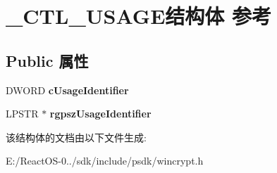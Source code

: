 \hypertarget{struct___c_t_l___u_s_a_g_e}{}\section{\+\_\+\+C\+T\+L\+\_\+\+U\+S\+A\+G\+E结构体 参考}
\label{struct___c_t_l___u_s_a_g_e}
\subsection*{Public 属性}
\begin{DoxyCompactItemize}
\item 
\mbox{\label{struct___c_t_l___u_s_a_g_e_a265336780489b5fd7a10097be10fc009}} 
D\+W\+O\+RD {\bfseries c\+Usage\+Identifier}
\item 
\mbox{\label{struct___c_t_l___u_s_a_g_e_ac406bca4c35fc6594518e280729694dc}} 
L\+P\+S\+TR $\ast$ {\bfseries rgpsz\+Usage\+Identifier}
\end{DoxyCompactItemize}


该结构体的文档由以下文件生成\+:\begin{DoxyCompactItemize}
\item 
E\+:/\+React\+O\+S-\/0../sdk/include/psdk/wincrypt.\+h\end{DoxyCompactItemize}
